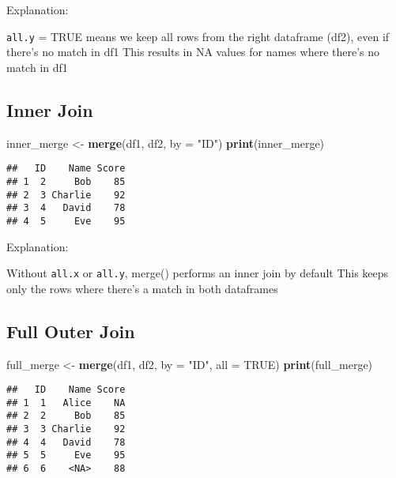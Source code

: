 \documentclass[
]{article}
\newenvironment{Shaded}{\begin{snugshade}}{\end{snugshade}}
\newcommand{\AttributeTok}[1]{\textcolor[rgb]{0.13,0.29,0.53}{#1}}
\newcommand{\ConstantTok}[1]{\textcolor[rgb]{0.56,0.35,0.01}{#1}}
\newcommand{\FunctionTok}[1]{\textcolor[rgb]{0.13,0.29,0.53}{\textbf{#1}}}
\newcommand{\NormalTok}[1]{#1}
\newcommand{\OtherTok}[1]{\textcolor[rgb]{0.56,0.35,0.01}{#1}}
\newcommand{\StringTok}[1]{\textcolor[rgb]{0.31,0.60,0.02}{#1}}
\begin{document}
Explanation:

\texttt{all.y} = TRUE means we keep all rows from the right dataframe
(df2), even if there's no match in df1 This results in NA values for
names where there's no match in df1

\hypertarget{inner-join}{%
\subsection{Inner Join}\label{inner-join}}

\begin{Shaded}
\begin{Highlighting}[]
\NormalTok{inner\_merge }\OtherTok{\textless{}{-}} \FunctionTok{merge}\NormalTok{(df1, df2, }\AttributeTok{by =} \StringTok{"ID"}\NormalTok{)}
\FunctionTok{print}\NormalTok{(inner\_merge)}
\end{Highlighting}
\end{Shaded}

\begin{verbatim}
##   ID    Name Score
## 1  2     Bob    85
## 2  3 Charlie    92
## 3  4   David    78
## 4  5     Eve    95
\end{verbatim}

Explanation:

Without \texttt{all.x} or \texttt{all.y}, merge() performs an inner join
by default This keeps only the rows where there's a match in both
dataframes

\hypertarget{full-outer-join}{%
\subsection{Full Outer Join}\label{full-outer-join}}

\begin{Shaded}
\begin{Highlighting}[]
\NormalTok{full\_merge }\OtherTok{\textless{}{-}} \FunctionTok{merge}\NormalTok{(df1, df2, }\AttributeTok{by =} \StringTok{"ID"}\NormalTok{, }\AttributeTok{all =} \ConstantTok{TRUE}\NormalTok{)}
\FunctionTok{print}\NormalTok{(full\_merge)}
\end{Highlighting}
\end{Shaded}

\begin{verbatim}
##   ID    Name Score
## 1  1   Alice    NA
## 2  2     Bob    85
## 3  3 Charlie    92
## 4  4   David    78
## 5  5     Eve    95
## 6  6    <NA>    88
\end{verbatim}
\end{document}
